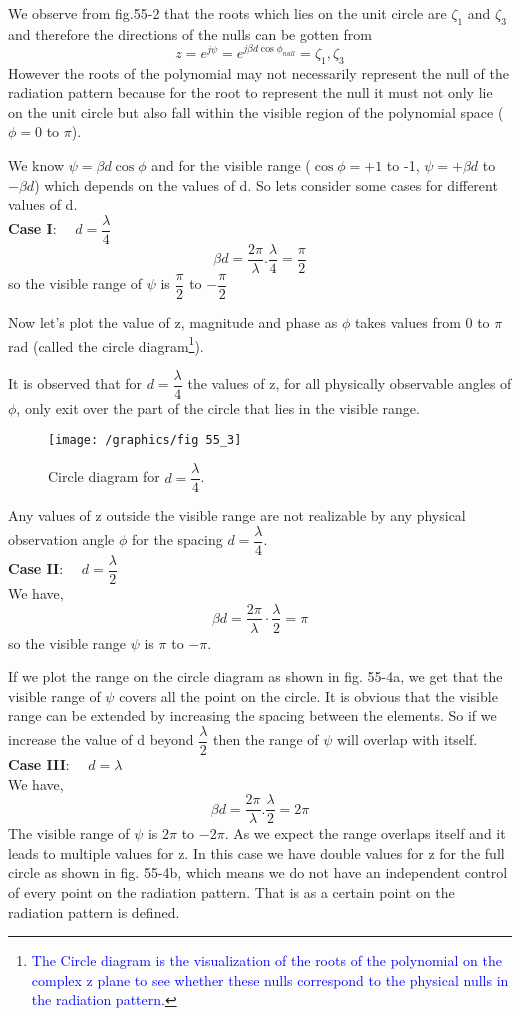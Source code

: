 We observe from fig.55-2 that the roots which lies on the unit circle are $\zeta_1$ and $\zeta_3$ and therefore the directions of the nulls can be gotten from $$z=e^{j\psi}=e^{j\beta d\cos\phi_{null}}=\zeta_1, \zeta_3$$ However the roots of the polynomial may not necessarily represent the null of the radiation pattern because for the root to represent the null it  must not only lie on the unit circle but also fall within the visible region of the polynomial space ($\phi=0$ to $\pi$).

We know $\psi=\beta d\cos\phi$ and for the visible range ($\cos\phi=+1$ to -1, $\psi=+\beta d$ to $-\beta d$) which depends on the values of d. So lets consider some cases for different values of d.\\
\textbf{Case I}: $\quad d=\dfrac{\lambda}{4}$
$$\beta d=\dfrac{2\pi}{\lambda}.\dfrac{\lambda}{4}=\dfrac{\pi}{2}$$ so the visible range of $\psi$ is $\dfrac{\pi}{2}$ to $-\dfrac{\pi}{2}$

Now let's plot the value of z, magnitude and phase as $\phi$ takes values from 0 to $\pi$ rad (called the circle diagram\footnote{\textcolor{blue}{The Circle diagram is the visualization of the roots of the polynomial on the complex z plane to see whether these nulls correspond to the physical nulls in the radiation pattern.}}).

It is observed that for $d=\dfrac{\lambda}{4}$ the values of z, for all physically observable angles of $\phi$, only exit over the part of the circle that lies in the visible range.
\begin{figure}[h]
\centering
\texttt{[image: /graphics/fig 55\_3]}
\caption{  Circle diagram for $d=\dfrac{\lambda}{4}$.}
\label{fig:fig-55-3}
\end{figure}

Any values of z outside the visible range are not realizable by any physical observation angle $\phi$ for the spacing $d=\dfrac{\lambda}{4}$.\\
\textbf{Case II}: $\quad d=\dfrac{\lambda}{2}$\\
We have, $$\beta d=\dfrac{2\pi}{\lambda}\cdot \frac{\lambda}{2} = \pi$$
so the visible range $\psi$ is $\pi$ to $-\pi$.

If we plot the range on the circle diagram as shown in fig. 55-4a, we get that the visible range of $\psi$ covers all the point on the circle. It is obvious that the visible range can be extended by increasing the spacing between the elements. So if we increase the value of d beyond $\dfrac{\lambda}{2}$ then the range of $\psi$ will overlap with itself.\\
\textbf{Case III}: $\quad d=\lambda$\\
We have, $$\beta d=\dfrac{2\pi}{\lambda}.\dfrac{\lambda}{2} = 2\pi$$
The visible range of $\psi$ is $2\pi$ to $-2\pi$. As we expect the range overlaps itself and it leads to multiple values for z. In this case we have double values for z for the full circle as shown in fig. 55-4b, which means we do not have an independent control of every point on the radiation pattern. That is as a certain point on the radiation pattern is defined.
